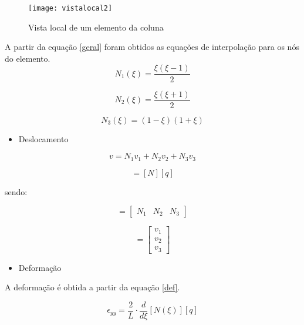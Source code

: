 \documentclass{article} %
\begin{document}
\begin{figure}[H]
	\centering
	\caption{Vista local de um elemento da coluna}
	\texttt{[image: vistalocal2]}	
	\label{patton}	
\end{figure}

A partir da equação \ref{geral} foram obtidos as equações de interpolação para os nós do elemento.
\begin{equation}
N_1(\xi)=\frac{\xi(\xi-1)}{2}
\end{equation}



\begin{equation}
N_2(\xi)=\frac{\xi(\xi+1)}{2}
\end{equation}

\begin{equation}
N_3(\xi)=(1-\xi)(1+\xi)
\end{equation}



\begin{itemize}
	\item Deslocamento
\end{itemize}


\begin{equation}
v=N_1v_1+N_2v_2+N_3v_3
\end{equation}

\begin{equation}
[v]=[N][q]
\end{equation}

\indent sendo:

\begin{equation}
[N]=\begin{bmatrix}
N_1& N_2&N_3 
\end{bmatrix}
\end{equation}

\begin{equation}
[q]=\begin{bmatrix}
v_1\\ v_2\\v_3
\end{bmatrix}
\end{equation}

\begin{itemize}
	\item Deformação
\end{itemize}

A deformação é obtida a partir da equação \ref{def}.


\begin{equation*}
\epsilon_{yy}=\frac{2}{L}\cdot\frac{d}{d\xi}[N(\xi)][q]
\end{equation*}
\end{document}
